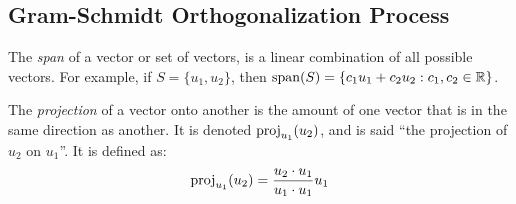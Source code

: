 \subsection{Gram-Schmidt Orthogonalization Process}\label{subsec:Gram-Schmidt_Orthogonalization}
\begin{definition}[Span]\label{def:Span}
  The \emph{span} of a vector or set of vectors, is a linear combination of all possible vectors.
  For example, if $S = \lbrace u_{1}, u_{2} \rbrace$, then $\Span(S) = \lbrace c_{1}u_{1} + c_{2}u_{2} : c_{1}, c_{2} \in \RealNumbers \rbrace$.
\end{definition}

\begin{definition}[Projection]\label{def:Vector_Projection}
  The \emph{projection} of a vector onto another is the amount of one vector that is in the same direction as another.
  It is denoted $\Proj{u_{2}}{u_{1}}$, and is said ``the projection of $u_{2}$ on $u_{1}$''.
  It is defined as:
  \begin{equation}\label{eq:Vector_Projection}
    \Proj{u_{2}}{u_{1}} = \frac{u_{2} \cdot u_{1}}{u_{1} \cdot u_{1}} u_{1}
  \end{equation}
\end{definition}


